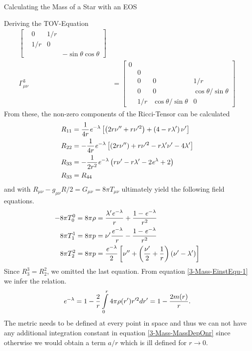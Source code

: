 \begin{section}{Calculating the Mass of a Star with an EOS}
\begin{subsection}{Deriving the TOV-Equation}
\begin{align}
\begin{bmatrix}
	                     	& 0 & 1/r &\\
	                     	& 1/r & 0 &\\
	                     	& & & -\sin\theta\cos\theta
	                     \end{bmatrix}\\
	\Gamma_{\mu\nu}^3 &= \begin{bmatrix}
	                     	0 & & &\\
	                     	& 0 & &\\
	                     	& 0 & 0 & 1/r\\
	                     	& 0 & 0 & \cos\theta/\sin\theta\\
	                     	& 1/r & \cos\theta/\sin\theta & 0
						\end{bmatrix}
\end{align}
From these, the non-zero components of the Ricci-Tensor can be calculated 
\begin{align}
	R_{11} &= \frac{1}{4r}\mathit{e}^{-\lambda}\left[\left(2r\nu''+r\nu'^2\right) + \left(4-r\lambda'\right)\nu'\right]\\
	R_{22} &= -\frac{1}{4r}\mathit{e}^{-\lambda}\left[\left(2r\nu''\right)+r\nu'^2-r\lambda'\nu'-4\lambda'\right]\\
	R_{33} &= -\frac{1}{2r^2}\mathit{e}^{-\lambda}\left(r\nu'-r\lambda'-2\mathit{e}^\lambda+2\right)\\
	R_{33} &= R_{44}
\end{align}
and with $R_{\mu\nu}-g_{\mu\nu}R/2=G_{\mu\nu}=8\pi T_{\mu\nu}$ ultimately yield the following field equations.
\begin{align}
	-8\pi T_0^0 = 8\pi\rho &= \frac{\lambda'\mathit{e}^{-\lambda}}{r}+\frac{1-\mathit{e}^{-\lambda}}{r^2}\label{3-Mass-EinstEqu-1}\\
	8\pi T_1^1 = 8\pi p &= \nu'\frac{\mathit{e}^{-\lambda}}{r} - \frac{1-\mathit{e}^{-\lambda}}{r^2}\label{3-Mass-EinstEqu-2}\\
	8\pi T_2^2 = 8\pi p &= \frac{\mathit{e}^{-\lambda}}{2}\left[\nu''+\left(\frac{\nu'}{2} + \frac{1}{r}\right)\left(\nu'-\lambda'\right) \right]\label{3-Mass-EinstEqu-3}
\end{align}
Since $R_3^3=R_2^2$, we omitted the last equation. From equation \eqref{3-Mass-EinstEqu-1} we infer the relation.
\begin{equation}
	\mathit{e}^{-\lambda} = 1 - \frac{2}{r}\int\limits_0^r 4\pi\rho(r') r'^2dr' = 1 - \frac{2m(r)}{r}.
	\label{3-Mass-MassDepOnr}
\end{equation}
The metric needs to be defined at every point in space and thus we can not have any additional integration constant in equation \eqref{3-Mass-MassDepOnr} since otherwise we would obtain a term $a/r$ which is ill defined for $r\rightarrow0$.\\

\end{subsection}
\end{section}
